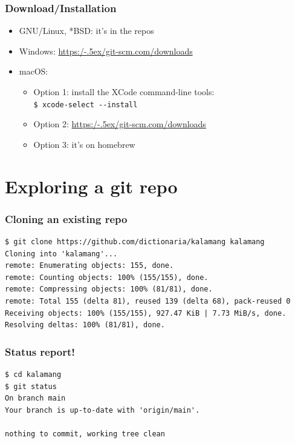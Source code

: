 \documentclass[12pt]{beamer}
\begin{document}
\begin{frame}[fragile]
  \frametitle{Download/Installation}

  \begin{itemize}
    \item GNU/Linux, *BSD: it's in the repos
    \item Windows: \href{https://git-scm.com/downloads}{https:/\kern-.5ex/git-scm.com/downloads}
    \item macOS:
      \begin{itemize}
        \item Option 1: install the XCode command-line tools:\\
          \verb"$ xcode-select --install"
        \item Option 2: \href{https://git-scm.com/downloads}{https:/\kern-.5ex/git-scm.com/downloads}
        \item Option 3: it's on homebrew
      \end{itemize}
  \end{itemize}
\end{frame}


\section{Exploring a git repo}

\begin{frame}[fragile]
  \frametitle{Cloning an existing repo}

  {\footnotesize{}%
    \begin{verbatim}
$ git clone https://github.com/dictionaria/kalamang kalamang
Cloning into 'kalamang'...
remote: Enumerating objects: 155, done.
remote: Counting objects: 100% (155/155), done.
remote: Compressing objects: 100% (81/81), done.
remote: Total 155 (delta 81), reused 139 (delta 68), pack-reused 0
Receiving objects: 100% (155/155), 927.47 KiB | 7.73 MiB/s, done.
Resolving deltas: 100% (81/81), done.
    \end{verbatim}%
  }
\end{frame}

\begin{frame}[fragile]
  \frametitle{Status report!}

  {\footnotesize{}%
    \begin{verbatim}
$ cd kalamang
$ git status
On branch main
Your branch is up-to-date with 'origin/main'.

nothing to commit, working tree clean
    \end{verbatim}%
  }
\end{frame}
\end{document}
